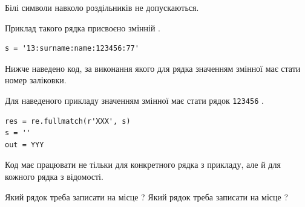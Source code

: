 \documentclass[12pt, ukrainian]{article}
\def\code#1{\Verb!#1!}
\begin{document}
{Білі символи навколо роздільників не допускаються.

Приклад такого рядка присвоєно змінній .



\begin{verbatim}
s = '13:surname:name:123456:77'
\end{verbatim}


Нижче наведено код, за виконання якого для рядка  значенням змінної  має стати номер заліковки.

Для наведеного прикладу значенням змінної  має стати рядок \code{123456} .



\begin{verbatim}
res = re.fullmatch(r'XXX', s)
s = ''
out = YYY
\end{verbatim}


Код має працювати не тільки для конкретного рядка з прикладу, але й для кожного рядка з відомості.


Який рядок треба записати на місце  ?
Який рядок треба записати на місце  ?\par

}
\newpage
\end{document}
